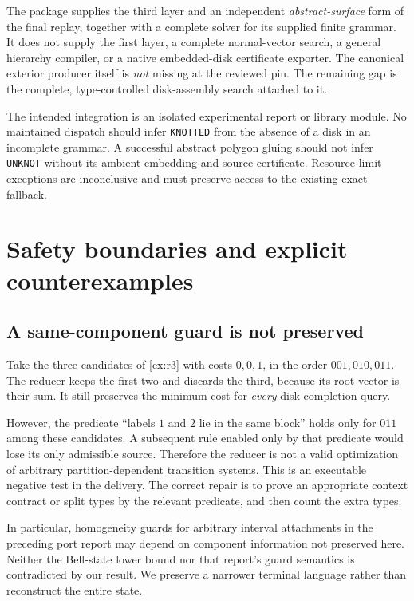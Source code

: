 \documentclass[11pt,a4paper]{article}
\theoremstyle{definition}
\theoremstyle{remark}
\begin{document}
The package supplies the third layer and an independent \emph{abstract-surface} form
of the final replay, together with a complete solver for its supplied finite grammar.
It does not supply the first layer, a complete normal-vector search, a general hierarchy
compiler, or a native embedded-disk certificate exporter. The canonical exterior
producer itself is \emph{not} missing at the reviewed pin. The remaining gap is the
complete, type-controlled disk-assembly search attached to it.

The intended integration is an isolated experimental report or library module. No
maintained dispatch should infer \texttt{KNOTTED} from the absence of a disk in an
incomplete grammar. A successful abstract polygon gluing should not infer
\texttt{UNKNOT} without its ambient embedding and source certificate. Resource-limit
exceptions are inconclusive and must preserve access to the existing exact fallback.

\section{Safety boundaries and explicit counterexamples}\label{sec:barriers}
\subsection{A same-component guard is not preserved}
Take the three candidates of \cref{ex:r3} with costs $0,0,1$, in the order
$001,010,011$. The reducer keeps the first two and discards the third, because its
root vector is their sum. It still preserves the minimum cost for \emph{every}
disk-completion query.

However, the predicate ``labels $1$ and $2$ lie in the same block'' holds only for
$011$ among these candidates. A subsequent rule enabled only by that predicate
would lose its only admissible source. Therefore the reducer is not a valid
optimization of arbitrary partition-dependent transition systems. This is an executable
negative test in the delivery. The correct repair is to prove an appropriate context
contract or split types by the relevant predicate, and then count the extra types.

In particular, homogeneity guards for arbitrary interval attachments in the preceding
port report may depend on component information not preserved here. Neither the
Bell-state lower bound nor that report's guard semantics is contradicted by our result.
We preserve a narrower terminal language rather than reconstruct the entire state.
\end{document}

